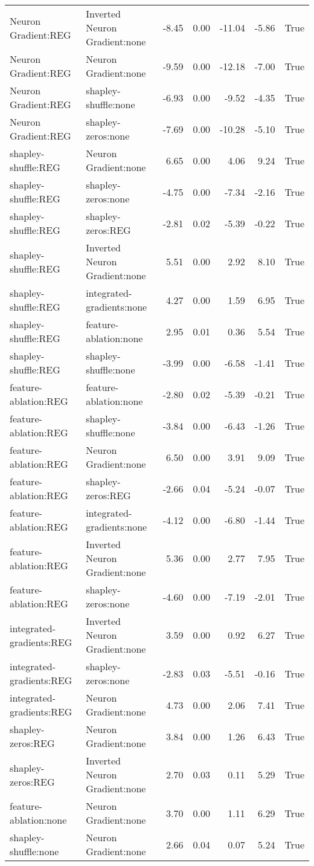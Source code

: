 \begin{table}[thb]
{\begin{tabular}{llrrrrr}
 Neuron Gradient:REG & Inverted Neuron Gradient:none & -8.45 & 0.00 & -11.04 & -5.86 & True \\
 Neuron Gradient:REG & Neuron Gradient:none & -9.59 & 0.00 & -12.18 & -7.00 & True \\
 Neuron Gradient:REG & shapley-shuffle:none & -6.93 & 0.00 & -9.52 & -4.35 & True \\
 Neuron Gradient:REG & shapley-zeros:none & -7.69 & 0.00 & -10.28 & -5.10 & True \\
 shapley-shuffle:REG & Neuron Gradient:none & 6.65 & 0.00 & 4.06 & 9.24 & True \\
 shapley-shuffle:REG & shapley-zeros:none & -4.75 & 0.00 & -7.34 & -2.16 & True \\
 shapley-shuffle:REG & shapley-zeros:REG & -2.81 & 0.02 & -5.39 & -0.22 & True \\
 shapley-shuffle:REG & Inverted Neuron Gradient:none & 5.51 & 0.00 & 2.92 & 8.10 & True \\
 shapley-shuffle:REG & integrated-gradients:none & 4.27 & 0.00 & 1.59 & 6.95 & True \\
 shapley-shuffle:REG & feature-ablation:none & 2.95 & 0.01 & 0.36 & 5.54 & True \\
 shapley-shuffle:REG & shapley-shuffle:none & -3.99 & 0.00 & -6.58 & -1.41 & True \\
 feature-ablation:REG & feature-ablation:none & -2.80 & 0.02 & -5.39 & -0.21 & True \\
 feature-ablation:REG & shapley-shuffle:none & -3.84 & 0.00 & -6.43 & -1.26 & True \\
 feature-ablation:REG & Neuron Gradient:none & 6.50 & 0.00 & 3.91 & 9.09 & True \\
 feature-ablation:REG & shapley-zeros:REG & -2.66 & 0.04 & -5.24 & -0.07 & True \\
 feature-ablation:REG & integrated-gradients:none & -4.12 & 0.00 & -6.80 & -1.44 & True \\
 feature-ablation:REG & Inverted Neuron Gradient:none & 5.36 & 0.00 & 2.77 & 7.95 & True \\
 feature-ablation:REG & shapley-zeros:none & -4.60 & 0.00 & -7.19 & -2.01 & True \\
 integrated-gradients:REG & Inverted Neuron Gradient:none & 3.59 & 0.00 & 0.92 & 6.27 & True \\
 integrated-gradients:REG & shapley-zeros:none & -2.83 & 0.03 & -5.51 & -0.16 & True \\
 integrated-gradients:REG & Neuron Gradient:none & 4.73 & 0.00 & 2.06 & 7.41 & True \\
 shapley-zeros:REG & Neuron Gradient:none & 3.84 & 0.00 & 1.26 & 6.43 & True \\
 shapley-zeros:REG & Inverted Neuron Gradient:none & 2.70 & 0.03 & 0.11 & 5.29 & True \\
 feature-ablation:none & Neuron Gradient:none & 3.70 & 0.00 & 1.11 & 6.29 & True \\
 shapley-shuffle:none & Neuron Gradient:none & 2.66 & 0.04 & 0.07 & 5.24 & True \\
\bottomrule
\end{tabular}
    }
\end{table}


